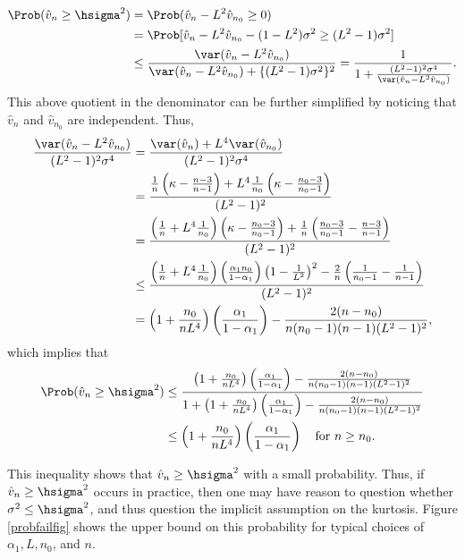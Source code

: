 \documentclass[12pt]{amsart}
\newcommand{\hv}{\hat{v}}
\begin{document}
\begin{align*}
\Prob(\hv_n \ge \hsigma^2) & = \Prob(\hv_n - L^2 \hv_{n_0}\ge 0) \\
& = \Prob[\hv_n - L^2 \hv_{n_0} - (1 - L^2) \sigma^2 \ge (L^2 - 1) \sigma^2] \\
& \le \frac{\var(\hv_n - L^2 \hv_{n_0})}{\var(\hv_n - L^2 \hv_{n_0}) + \{(L^2 - 1) \sigma^2\}^2} = \frac{1}{1 + \frac{(L^2 - 1)^2 \sigma^4}{\var(\hv_n - L^2 \hv_{n_0})}}.
\end{align*}
This above quotient in the denominator can be further simplified by noticing that $\hv_n$ and $\hv_{n_0}$ are independent.  Thus,
\begin{align*}
\frac{\var(\hv_n - L^2 \hv_{n_0})}{(L^2 - 1)^2 \sigma^4}
& = \frac{\var(\hv_n) + L^4 \var(\hv_{n_0})}{(L^2 - 1)^2 \sigma^4} \\
& = \frac{\frac{1}{n} \left ( \kappa  - \frac{n-3}{n-1} \right) + L^4 \frac{1}{n_0} \left ( \kappa  - \frac{n_0-3}{n_0-1} \right)}{(L^2 - 1)^2} \\
& = \frac{\left(\frac{1}{n} + L^4 \frac{1}{n_0} \right)\left ( \kappa  - \frac{n_0-3}{n_0-1} \right) + \frac{1}{n} \left ( \frac{n_0-3}{n_0-1}  - \frac{n-3}{n-1} \right)}{(L^2 - 1)^2} \\
& \le \frac{\left(\frac{1}{n} + L^4 \frac{1}{n_0} \right) \left(\frac{ \alpha_1 n_0}{1-\alpha_1}\right) \left(1 - \frac{1}{L^2}\right)^2 - \frac{2}{n} \left ( \frac{1}{n_0-1}  - \frac{1}{n-1} \right)}{(L^2 - 1)^2} \\
& = \left(1 + \frac{n_0}{nL^4} \right) \left(\frac{ \alpha_1}{1-\alpha_1}\right)  - \frac{2(n-n_0)}{n(n_0-1)(n-1)(L^2 - 1)^2},
\end{align*}
which implies that 
\begin{align} \label{probfail}
\Prob(\hv_n \ge \hsigma^2) 
 & \le \frac{\left(1 + \frac{n_0}{nL^4} \right) \left(\frac{ \alpha_1}{1-\alpha_1}\right)  - \frac{2(n-n_0)} {n(n_0-1)(n-1)(L^2 - 1)^2}} {1+\left(1 + \frac{n_0}{nL^4} \right) \left(\frac{ \alpha_1}{1-\alpha_1}\right)  - \frac{2(n-n_0)}{n(n_0-1)(n-1)(L^2 - 1)^2}}\\
\nonumber & \le \left(1 + \frac{n_0}{nL^4} \right) \left(\frac{ \alpha_1}{1-\alpha_1}\right) \quad \text{for } n \ge n_0.
\end{align}

This inequality shows that $\hv_n \ge \hsigma^2$ with a small probability.  Thus, if $\hv_n \ge \hsigma^2$ occurs in practice, then one may have reason to question whether $\sigma^2 \le \hsigma^2$, and thus question the implicit assumption on the kurtosis. Figure \ref{probfailfig} shows the upper bound on this probability for typical choices of $\alpha_1, L, n_0$, and $n$.
\end{document}
